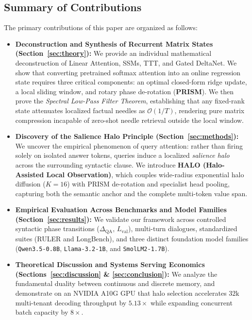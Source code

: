 \documentclass[11pt,a4paper]{article}
\begin{document}
\subsection{Summary of Contributions}
The primary contributions of this paper are organized as follows:
\begin{itemize}[leftmargin=*]
    \item \textbf{Deconstruction and Synthesis of Recurrent Matrix States (Section~\ref{sec:theory}):} We provide an individual mathematical deconstruction of Linear Attention, SSMs, TTT, and Gated DeltaNet. We show that converting pretrained softmax attention into an online regression state requires three critical components: an optimal closed-form ridge update, a local sliding window, and rotary phase de-rotation (\textbf{PRISM}). We then prove the \textit{Spectral Low-Pass Filter Theorem}, establishing that any fixed-rank state attenuates localized factual needles as $\mathcal{O}(1/T)$, rendering pure matrix compression incapable of zero-shot needle retrieval outside the local window.
    \item \textbf{Discovery of the Salience Halo Principle (Section~\ref{sec:methods}):} We uncover the empirical phenomenon of query attention: rather than firing solely on isolated answer tokens, queries induce a localized \textit{salience halo} across the surrounding syntactic clause. We introduce \textbf{HALO (Halo-Assisted Local Observation)}, which couples wide-radius exponential halo diffusion ($K=16$) with PRISM de-rotation and specialist head pooling, capturing both the semantic anchor and the complete multi-token value span.
    \item \textbf{Empirical Evaluation Across Benchmarks and Model Families (Section~\ref{sec:results}):} We validate our framework across controlled syntactic phase transitions ($\Delta_{\text{QA}}$, $L_{\text{val}}$), multi-turn dialogues, standardized suites (RULER and LongBench), and three distinct foundation model families (\texttt{Qwen3.5-0.8B}, \texttt{Llama-3.2-1B}, and \texttt{SmolLM2-1.7B}).
    \item \textbf{Theoretical Discussion and Systems Serving Economics (Sections~\ref{sec:discussion} \& \ref{sec:conclusion}):} We analyze the fundamental duality between continuous and discrete memory, and demonstrate on an NVIDIA A10G GPU that halo selection accelerates $32\text{k}$ multi-tenant decoding throughput by $5.13\times$ while expanding concurrent batch capacity by $8\times$.
\end{itemize}
\end{document}
